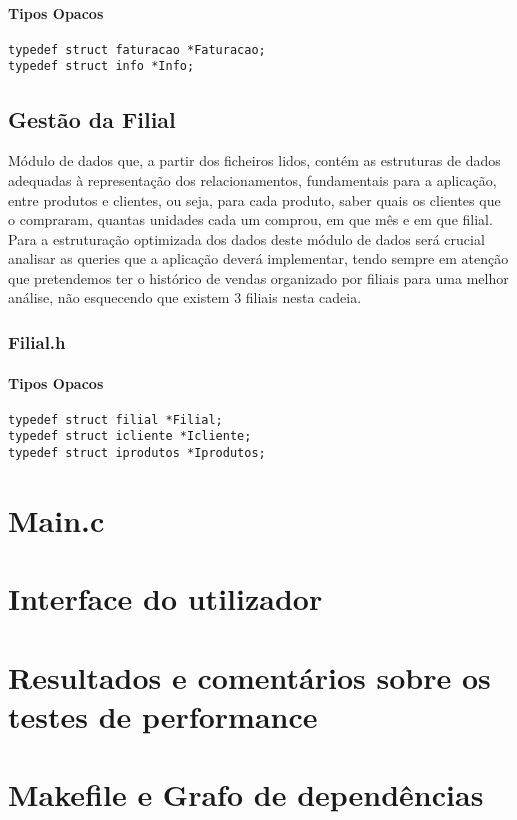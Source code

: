 \subsubsection{Tipos Opacos}
\begin{Verbatim}
typedef struct faturacao *Faturacao;
typedef struct info *Info;
\end{Verbatim}

\section{Gestão da Filial}


Módulo de dados que, a partir dos ficheiros lidos, contém as estruturas de dados adequadas à representação dos relacionamentos, fundamentais para a aplicação, entre produtos e clientes, ou seja, para cada produto, saber quais os clientes que o compraram, quantas unidades cada um comprou, em que mês e em que filial. Para a estruturação optimizada dos dados deste módulo de dados será crucial analisar as queries que a aplicação deverá implementar, tendo sempre em atenção que pretendemos ter o histórico de vendas organizado por filiais para uma melhor análise, não esquecendo que existem 3 filiais nesta cadeia. 

\subsection{Filial.h}

\subsubsection{Tipos Opacos}
\begin{Verbatim}
typedef struct filial *Filial;
typedef struct icliente *Icliente;
typedef struct iprodutos *Iprodutos;
\end{Verbatim}


\chapter{Main.c}

\chapter{Interface do utilizador}

\chapter{Resultados e comentários sobre os testes de performance}

\chapter{Makefile e Grafo de dependências}